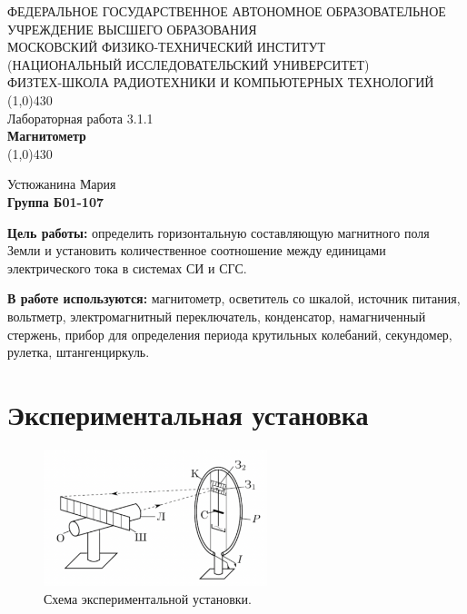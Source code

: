 \documentclass[11pt]{article}
\begin{document}
\begin{titlepage}
\begin{center}
\large{\small ФЕДЕРАЛЬНОЕ ГОСУДАРСТВЕННОЕ АВТОНОМНОЕ ОБРАЗОВАТЕЛЬНОЕ\\ УЧРЕЖДЕНИЕ ВЫСШЕГО ОБРАЗОВАНИЯ\\ МОСКОВСКИЙ ФИЗИКО-ТЕХНИЧЕСКИЙ ИНСТИТУТ\\ (НАЦИОНАЛЬНЫЙ ИССЛЕДОВАТЕЛЬСКИЙ УНИВЕРСИТЕТ)\\ ФИЗТЕХ-ШКОЛА РАДИОТЕХНИКИ И КОМПЬЮТЕРНЫХ ТЕХНОЛОГИЙ}
\vfill
\line(1,0){430}\\[1mm]
\huge{Лабораторная работа 3.1.1}\\
\huge\textbf{Магнитометр}\\
\line(1,0){430}\\[1mm]
\vfill
\begin{flushright}
\normalsize{Устюжанина Мария}\\
\normalsize{\textbf{Группа Б01-107}}\\
\end{flushright}
\end{center}
\end{titlepage}

\par \textbf{Цель работы:} определить горизонтальную составляющую магнитного поля Земли и установить количественное соотношение между
единицами электрического тока в системах СИ и СГС.

\par \textbf{В работе используются:} магнитометр, осветитель со шкалой, источ­ник питания, вольтметр, электромагнитный переключатель, конденсатор, намагниченный стержень, прибор для определения периода крутильных колебаний, секундомер, рулетка, штангенциркуль.

\section{Экспериментальная установка}

\begin{figure}
    \includegraphics[width=6.5cm]{ustanovka.png}
    \caption{Схема экспериментальной установки.}
    \label{pic:2}
\end{figure}
\end{document}

